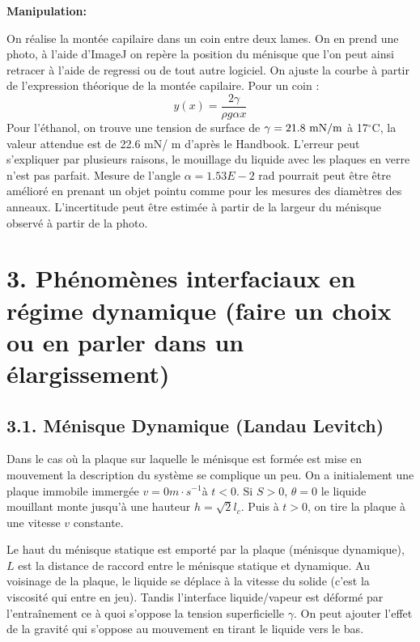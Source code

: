 \documentclass[french, a4paper, 10pt, twocolumn, landscape]{article}
\begin{document}
\noindent\textbf{Manipulation:}\medskip
   
  On r{\'e}alise la mont{\'e}e capilaire dans un coin entre deux lames. On en
  prend une photo, {\`a} l'aide d'ImageJ on rep{\`e}re la position du
  m{\'e}nisque que l'on peut ainsi retracer {\`a} l'aide de regressi ou de
  tout autre logiciel. On ajuste la courbe {\`a} partir de l'expression
  th{\'e}orique de la mont{\'e}e capilaire. Pour un coin :
\begin{equation}
  y (x) = \dfrac{2 \gamma}{\rho g \alpha x}  
\end{equation}
  Pour l'{\'e}thanol, on trouve une tension de surface de $\gamma = 21.8
  \rm~{mN} / m $ à 17$^{\circ}$C, la valeur attendue est de 22.6 mN/ m d'apr{\`e}s le Handbook. L'erreur peut s'expliquer par
  plusieurs raisons, le mouillage du liquide avec les plaques en verre n'est
  pas parfait. Mesure de l'angle $\alpha=1.53E-2$ rad pourrait peut {\^e}tre
  {\^e}tre am{\'e}lior{\'e} en prenant un objet pointu comme pour les mesures
  des diam{\`e}tres des anneaux. L'incertitude peut {\^e}tre estim{\'e}e {\`a}
  partir de la largeur du m{\'e}nisque observ{\'e} {\`a} partir de la photo.

\section*{3. Ph{\'e}nom{\`e}nes interfaciaux en r{\'e}gime dynamique (faire un
choix ou en parler dans un {\'e}largissement)}

\subsection*{3.1. M{\'e}nisque Dynamique (Landau Levitch)}

Dans le cas o{\`u} la plaque sur laquelle le m{\'e}nisque est form{\'e}e est
mise en mouvement la description du syst{\`e}me se complique un peu. On a
initialement une plaque immobile immerg{\'e}e $v = 0 m \cdot s^{- 1} ${\`a} $t
< 0$. Si $S > 0$, $\theta = 0$ le liquide mouillant monte jusqu'{\`a} une
hauteur $h = \sqrt{2} l_c$. Puis {\`a} $t > 0$, on tire la plaque {\`a} une
vitesse $v$ constante.



Le haut du m{\'e}nisque statique est emport{\'e} par la plaque
(m{\'e}nisque dynamique), $L$ est la distance de raccord entre le m{\'e}nisque
statique et dynamique. Au voisinage de la plaque, le liquide se d{\'e}place
{\`a} la vitesse du solide (c'est la viscosit{\'e} qui entre en jeu). Tandis
l'interface liquide/vapeur est d{\'e}form{\'e} par l'entraînement ce {\`a}
quoi s'oppose la tension superficielle $\gamma$. On peut ajouter l'effet de la
gravit{\'e} qui s'oppose au mouvement en tirant le liquide vers le bas.\medskip
\end{document}
